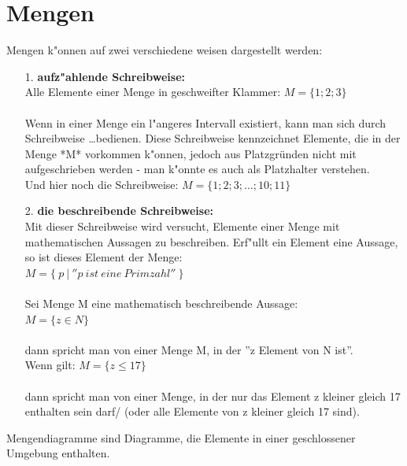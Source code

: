 \documentclass[10pt]{book}
\begin{document}
\chapter{Mengen}
Mengen k"onnen auf zwei verschiedene weisen dargestellt werden:
\begin{itemize}
  \item[1.]   \textbf{aufz"ahlende Schreibweise:}\\
  Alle Elemente einer Menge in geschweifter Klammer:
  $M = \{ 1;2;3 \}$ \\ \\
  Wenn in einer Menge ein l"angeres Intervall existiert,
  kann man sich durch Schreibweise \ldots bedienen.
  Diese Schreibweise kennzeichnet Elemente, die in der
  Menge *M* vorkommen k"onnen, jedoch aus Platzgründen
  nicht mit aufgeschrieben werden - man k"onnte es auch
  als Platzhalter verstehen. \\
  Und hier noch die Schreibweise: 
  $M = \{ 1;2;3; \ldots ;10;11 \}$
  \item[2.] \textbf{die beschreibende Schreibweise:} \\
  Mit dieser Schreibweise wird versucht, Elemente einer
  Menge mit mathematischen Aussagen zu beschreiben. Erf"ullt
  ein Element eine Aussage, so ist dieses Element der Menge: \\
  $M = \{ \: p \: | \: '' p \: ist \: eine \: Primzahl '' \: \}$ \\
  \\
  Sei Menge M eine mathematisch beschreibende Aussage:\\
  $M = \{z \in N \}$ \\
  \\
  dann spricht man von einer Menge M, in der ''z Element von N ist''. \\
  Wenn gilt: $M = \{z \le 17\}$\\
  \\
  dann spricht man von einer Menge, in der nur das Element z
  kleiner gleich 17 enthalten sein darf/ (oder alle Elemente
  von z kleiner gleich 17 sind). \\
\end{itemize}
Mengendiagramme sind Diagramme, die Elemente in einer
geschlossener Umgebung enthalten.



\end{document}
